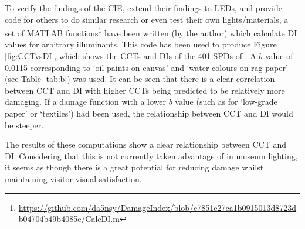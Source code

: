 To verify the findings of the \gls{CIE}, extend their findings to \glspl{LED}, and provide code for others to do similar research or even test their own lights/materials, a set of MATLAB functions\footnote{\url{https://github.com/da5nsy/DamageIndex/blob/c7851e27ca1b0915013d8723db04704b49b4085e/CalcDI.m}} have been written (by the author) which calculate \gls{DI} values for arbitrary illuminants. This code has been used to produce Figure \ref{fig:CCTvsDI}, which shows the \glspl{CCT} and \glspl{DI} of the 401 \glspl{SPD} of \citet{houser_review_2013}. A $b$ value of 0.0115 corresponding to `oil paints on canvas' and `water colours on rag paper' (see Table \ref{tab:b}) was used. It can be seen that there is a clear correlation between \gls{CCT} and \gls{DI} with higher \glspl{CCT} being predicted to be relatively more damaging. If a damage function with a lower $b$ value (such as for `low-grade paper' or `textiles') had been used, the relationship between \gls{CCT} and \gls{DI} would be steeper.

%

\begin{fullpagefigure}
\figpageside{}
\caption{The \glspl{CCT} and \glspl{DI} of the \glspl{SPD} used by \citet{houser_review_2013} (provided via personal communication, but now partially (without category information) available via \gls{PTB} as `spd\_houser').}
\label{fig:CCTvsDI}
\end{fullpagefigure}

The results of these computations show a clear relationship between \gls{CCT} and \gls{DI}. Considering that this is not currently taken advantage of in museum lighting, it seems as though there is a great potential for reducing damage whilst maintaining visitor visual satisfaction.



\clearpage


